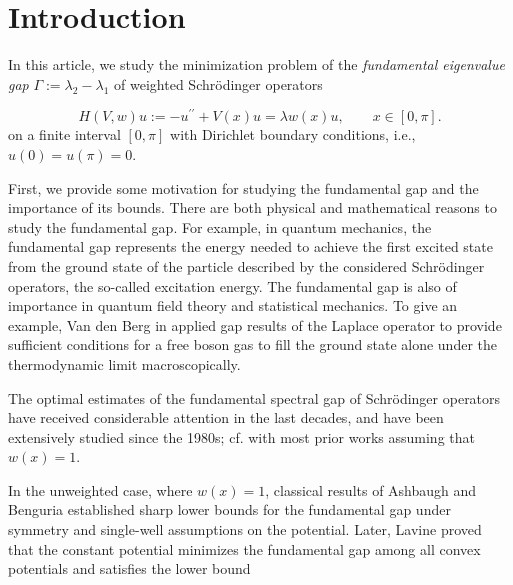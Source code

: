 \documentclass[12pt,a4paper]{amsart}
\begin{document}



\section{Introduction}






In this article, we study the minimization problem of the {\it fundamental eigenvalue gap}
$\Gamma := \lambda_2 - \lambda_1$ of weighted Schr\"{o}dinger operators

\begin{equation}\label{ePnoP}
H(V,w) u :=  -u^{\prime \prime} +V(x) u  = \lambda  w(x) u,
\quad\quad x\in [0,\pi].
\end{equation}
on a finite interval $[0,\pi]$ with Dirichlet boundary conditions, i.e., $u(0) = u(\pi) = 0$.

First, we provide some motivation for studying the fundamental gap and the importance of its bounds. There are both physical and mathematical reasons to study the fundamental gap. For example, in quantum mechanics, the fundamental gap represents
the energy needed to achieve the first excited state from the ground state of the
particle described by the considered Schr\"odinger operators, the so-called excitation
energy. The fundamental gap is also of importance in quantum field theory and 
statistical mechanics. To give an example, Van den Berg in \cite{Berg} applied gap 
results of the Laplace operator to provide sufficient conditions for a free boson gas 
to fill the ground state alone under the thermodynamic limit macroscopically. 

 The optimal estimates of the fundamental spectral gap of Schr\"odinger operators have received considerable attention in the last decades, and have been extensively studied since the 1980s; cf. \cite{Ash1, Ash2,Ash3, Ash4, ahrami, Ahrami3, Horvath1,Horvath2,Lavine} with most prior works assuming that $w(x)=1$.

 In the unweighted case,
where \(w(x)=1\), classical results of Ashbaugh and Benguria \cite{Ash1} established
sharp lower bounds for the fundamental gap under symmetry and single-well
assumptions on the potential. Later, Lavine \cite{Lavine} proved that the constant potential minimizes the fundamental gap among
all convex potentials and satisfies the lower bound
\end{document}
